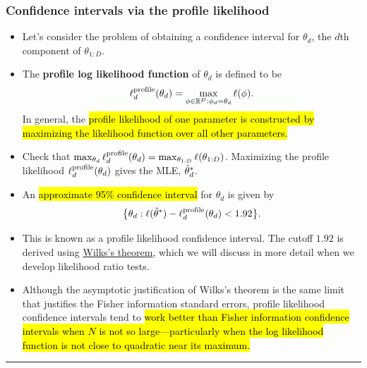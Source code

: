 \documentclass[]{article}
\begin{document}
\subsubsection{Confidence intervals via the profile
likelihood}\label{confidence-intervals-via-the-profile-likelihood}

\begin{itemize}
\item
  Let's consider the problem of obtaining a confidence interval for
  \(\theta_d\), the \(d\)th component of \(\theta_{1:D}\).
\item
  The \textbf{profile log likelihood function} of \(\theta_d\) is
  defined to be
  \[ \ell^\mathrm{profile}_d(\theta_d) = \max_{\phi\in\mathbb{R}^D: \phi_d=\theta_d}\ell(\phi).\]
  In general, the \hl{profile likelihood of one parameter is constructed by
  maximizing the likelihood function over all other parameters.}
\item
  Check that
  \(\max_{\theta_d}\ell^\mathrm{profile}_d(\theta_d) = \max_{\theta_{1:D}}\ell(\theta_{1:D})\).
  Maximizing the profile likelihood \(\ell^\mathrm{profile}_d(\theta_d)\)
  gives the MLE, \(\hat\theta_d^*\).
\item
  An \hl{approximate 95\% confidence interval} for \(\theta_d\) is given by
  \[ \big\{\theta_d : \ell(\hat\theta^*) - \ell^\mathrm{profile}_d(\theta_d)< 1.92\big\}.\]
  
\item
  This is known as a profile likelihood confidence interval. The cutoff
  \(1.92\) is derived using
  \href{https://en.wikipedia.org/wiki/Likelihood-ratio_test\#Distribution:_Wilks.27s_theorem}{Wilks's
  theorem}, which we will discuss in more detail when we develop
  likelihood ratio tests.
\item
  Although the asymptotic justification of Wilks's theorem is the same
  limit that justifies the Fisher information standard errors, profile
  likelihood confidence intervals tend to \hl{work better than Fisher
  information confidence intervals when $N$ is not so
  large---particularly when the log likelihood function is not close to
  quadratic near its maximum.}
\end{itemize}

\begin{center}\rule{0.5\linewidth}{\linethickness}\end{center}
\end{document}
